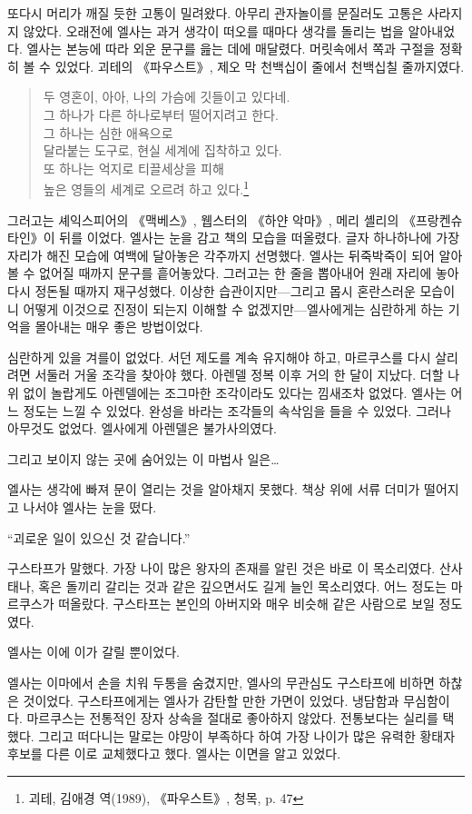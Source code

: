 또다시 머리가 깨질 듯한 고통이 밀려왔다. 아무리 관자놀이를 문질러도 고통은 사라지지 않았다. 오래전에 엘사는 과거 생각이 떠오를 때마다 생각를 돌리는 법을 알아내었다. 엘사는 본능에 따라 외운 문구를 읊는 데에 매달렸다. 머릿속에서 쪽과 구절을 정확히 볼 수 있었다. 괴테의 《파우스트》, 제오 막 천백십이 줄에서 천백십칠 줄까지였다.\begin{verse}두 영혼이, 아아, 나의 가슴에 깃들이고 있다네. \\ 그 하나가 다른 하나로부터 떨어지려고 한다. \\ 그 하나는 심한 애욕으로 \\ 달라붙는 도구로, 현실 세계에 집착하고 있다. \\ 또 하나는 억지로 티끌세상을 피해 \\ 높은 영들의 세계로 오르려 하고 있다.\footnote{괴테, 김애경 역(1989), 《파우스트》, 청목, p. 47}\end{verse}그러고는 셰익스피어의 《맥베스》, 웹스터의 《하얀 악마》, 메리 셸리의 《프랑켄슈타인》이 뒤를 이었다. 엘사는 눈을 감고 책의 모습을 떠올렸다. 글자 하나하나에 가장자리가 해진 모습에 여백에 달아놓은 각주까지 선명했다. 엘사는 뒤죽박죽이 되어 알아볼 수 없어질 때까지 문구를 흩어놓았다. 그러고는 한 줄을 뽑아내어 원래 자리에 놓아 다시 정돈될 때까지 재구성했다. 이상한 습관이지만—그리고 몹시 혼란스러운 모습이니 어떻게 이것으로 진정이 되는지 이해할 수 없겠지만—엘사에게는 심란하게 하는 기억을 몰아내는 매우 좋은 방법이었다.

심란하게 있을 겨를이 없었다. 서던 제도를 계속 유지해야 하고, 마르쿠스를 다시 살리려면 서둘러 거울 조각을 찾아야 했다. 아렌델 정복 이후 거의 한 달이 지났다. 더할 나위 없이 놀랍게도 아렌델에는 조그마한 조각이라도 있다는 낌새조차 없었다. 엘사는 어느 정도는 느낄 수 있었다. 완성을 바라는 조각들의 속삭임을 들을 수 있었다. 그러나 아무것도 없었다. 엘사에게 아렌델은 불가사의였다.

그리고 보이지 않는 곳에 숨어있는 이 마법사 일은\ldots

엘사는 생각에 빠져 문이 열리는 것을 알아채지 못했다. 책상 위에 서류 더미가 떨어지고 나서야 엘사는 눈을 떴다.

``괴로운 일이 있으신 것 같습니다.''

구스타프가 말했다. 가장 나이 많은 왕자의 존재를 알린 것은 바로 이 목소리였다. 산사태나, 혹은 돌끼리 갈리는 것과 같은 깊으면서도 길게 늘인 목소리였다. 어느 정도는 마르쿠스가 떠올랐다. 구스타프는 본인의 아버지와 매우 비슷해 같은 사람으로 보일 정도였다.

엘사는 이에 이가 갈릴 뿐이었다.

엘사는 이마에서 손을 치워 두통을 숨겼지만, 엘사의 무관심도 구스타프에 비하면 하찮은 것이었다. 구스타프에게는 엘사가 감탄할 만한 가면이 있었다. 냉담함과 무심함이다. 마르쿠스는 전통적인 장자 상속을 절대로 좋아하지 않았다. 전통보다는 실리를 택했다. 그리고 떠다니는 말로는 야망이 부족하다 하여 가장 나이가 많은 유력한 황태자 후보를 다른 이로 교체했다고 했다. 엘사는 이면을 알고 있었다.

